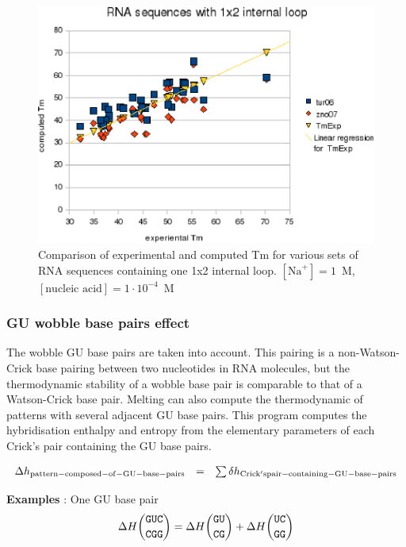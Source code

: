 \documentclass{article}
\begin{document}
\begin{figure}[h]
\includegraphics{images/1x2InternalLoop.eps}
\caption{Comparison of experimental and computed Tm for various sets of
 RNA sequences containing one 1x2 internal loop. $[\mbox{Na}^+] = 1$~M, $[\mbox{nucleic acid}] = 1\cdot{}10^{-4}$~M}
\end{figure}

\subsubsection{GU wobble base pairs effect}

The wobble GU base pairs are taken into account. This pairing is a non-Watson-Crick base pairing between two nucleotides 
in RNA molecules, but the thermodynamic stability of a wobble base pair is comparable to that of a Watson-Crick base pair.
Melting can also compute the thermodynamic of patterns with several adjacent GU base pairs.
This program computes the hybridisation enthalpy and entropy from the elementary 
parameters of each Crick's pair containing the GU base pairs.

\begin{displaymath}
  \begin{array}[t]{ccc}
  \Delta{}h_\mathrm{pattern-composed-of-GU-base-pairs}&=&\sum \delta{}h_\mathrm{Crick's pair-containing-GU-base-pairs}\\
  \end{array}
\end{displaymath}

\textbf{Examples} : One GU base pair
\begin{multline*}
\Delta H {\mbox{\texttt{GUC}} \choose \mbox{\texttt{CGG}}} = 
\Delta H {\mbox{\texttt{GU}} \choose \mbox{\texttt{CG}}} +
\Delta H {\mbox{\texttt{UC}} \choose \mbox{\texttt{GG}}}\\
\end{multline*}
\end{document}
